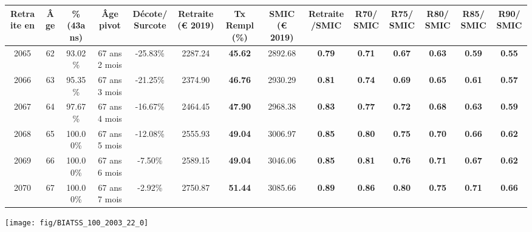 \begin{adjustbox}{max width=\textwidth} 
\begin{tabular}[htb]{|c|c||c|c|c||c|c||c|c||c|c|c|c|c|} 
\hline 
 Retraite en &  Âge &  \%(43ans) &  Âge pivot &  Décote/Surcote &  Retraite (\euro{} 2019) &  Tx Rempl(\%) &  SMIC (\euro{} 2019) &  Retraite/SMIC &  R70/SMIC &  R75/SMIC &  R80/SMIC &  R85/SMIC &  R90/SMIC \\ 
\hline \hline 
 2065 &  62 &  93.02\% &  67 ans 2 mois &  -25.83\% &  2287.24 &  {\bf 45.62} &  2892.68 &  {\bf {\color{red} 0.79}} &  {\bf {\color{red} 0.71}} &  {\bf {\color{red} 0.67}} &  {\bf {\color{red} 0.63}} &  {\bf {\color{red} 0.59}} &  {\bf {\color{red} 0.55}} \\ 
\hline 
 2066 &  63 &  95.35\% &  67 ans 3 mois &  -21.25\% &  2374.90 &  {\bf 46.76} &  2930.29 &  {\bf {\color{red} 0.81}} &  {\bf {\color{red} 0.74}} &  {\bf {\color{red} 0.69}} &  {\bf {\color{red} 0.65}} &  {\bf {\color{red} 0.61}} &  {\bf {\color{red} 0.57}} \\ 
\hline 
 2067 &  64 &  97.67\% &  67 ans 4 mois &  -16.67\% &  2464.45 &  {\bf 47.90} &  2968.38 &  {\bf {\color{red} 0.83}} &  {\bf {\color{red} 0.77}} &  {\bf {\color{red} 0.72}} &  {\bf {\color{red} 0.68}} &  {\bf {\color{red} 0.63}} &  {\bf {\color{red} 0.59}} \\ 
\hline 
 2068 &  65 &  100.00\% &  67 ans 5 mois &  -12.08\% &  2555.93 &  {\bf 49.04} &  3006.97 &  {\bf {\color{red} 0.85}} &  {\bf {\color{red} 0.80}} &  {\bf {\color{red} 0.75}} &  {\bf {\color{red} 0.70}} &  {\bf {\color{red} 0.66}} &  {\bf {\color{red} 0.62}} \\ 
\hline 
 2069 &  66 &  100.00\% &  67 ans 6 mois &  -7.50\% &  2589.15 &  {\bf 49.04} &  3046.06 &  {\bf {\color{red} 0.85}} &  {\bf {\color{red} 0.81}} &  {\bf {\color{red} 0.76}} &  {\bf {\color{red} 0.71}} &  {\bf {\color{red} 0.67}} &  {\bf {\color{red} 0.62}} \\ 
\hline 
 2070 &  67 &  100.00\% &  67 ans 7 mois &  -2.92\% &  2750.87 &  {\bf 51.44} &  3085.66 &  {\bf {\color{red} 0.89}} &  {\bf {\color{red} 0.86}} &  {\bf {\color{red} 0.80}} &  {\bf {\color{red} 0.75}} &  {\bf {\color{red} 0.71}} &  {\bf {\color{red} 0.66}} \\ 
\hline 
\hline 
\end{tabular} 
\end{adjustbox} 
 
 \vspace{0.1cm} 

 {\hspace{-2.2cm}\texttt{[image: fig/BIATSS\_100\_2003\_22\_0]}} 

